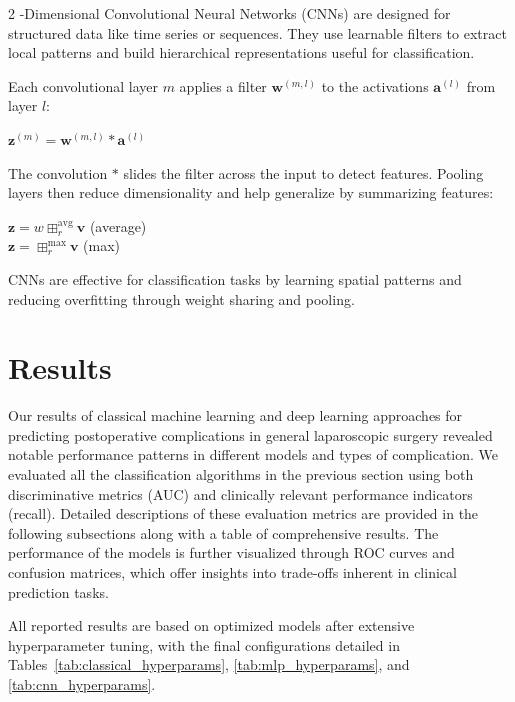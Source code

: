 \documentclass[bst/sn-nature]{sn-jnl}
\begin{document}
\begin{multicols}{2}
-Dimensional Convolutional Neural Networks (CNNs) are designed for structured data like time series or sequences. They use learnable filters to extract local patterns and build hierarchical representations useful for classification.

Each convolutional layer $m$ applies a filter $\mathbf{w}^{(m,l)}$ to the activations $\mathbf{a}^{(l)}$ from layer $l$: \\

\begin{center}
$\mathbf{z}^{(m)} = \mathbf{w}^{(m,l)} * \mathbf{a}^{(l)}$
\vspace{0.3cm}
\end{center}

The convolution $*$ slides the filter across the input to detect features. Pooling layers then reduce dimensionality and help generalize by summarizing features:

\begin{center}
$\mathbf{z} = w \boxplus_{r}^{\text{avg}} \mathbf{v}$ \quad (average)\\
$\mathbf{z} = \boxplus_{r}^{\text{max}} \mathbf{v}$ \quad (max)
\vspace{0.3cm}
\end{center}

CNNs are effective for classification tasks by learning spatial patterns and reducing overfitting through weight sharing and pooling.

\section{Results}

\quad Our results of classical machine learning and deep learning approaches for predicting postoperative complications in general laparoscopic surgery revealed notable performance patterns in different models and types of complication. We evaluated all the classification algorithms in the previous section using both discriminative metrics (AUC) and clinically relevant performance indicators (recall). Detailed descriptions of these evaluation metrics are provided in the following subsections along with a table of comprehensive results. The performance of the models is further visualized through ROC curves and confusion matrices, which offer insights into trade-offs inherent in clinical prediction tasks.

All reported results are based on optimized models after extensive hyperparameter tuning, with the final configurations detailed in Tables~\ref{tab:classical_hyperparams}, \ref{tab:mlp_hyperparams}, and \ref{tab:cnn_hyperparams}.


\end{multicols}
\end{document}

